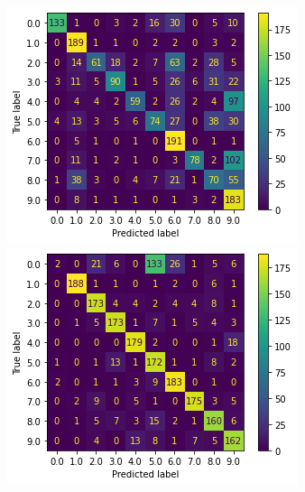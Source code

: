 \documentclass{article}
\begin{document}
\begin{figure}[!htb]
  \includegraphics[width=\linewidth]{figure/nb.png}
\endminipage\hfill
{}
  \includegraphics[width=\linewidth]{figure/nb_pca.png}
\endminipage\hfill
{}

\end{figure}
\end{document}
